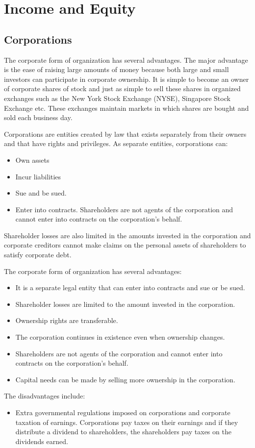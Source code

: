 \documentclass[../main.tex]{subfiles}
\begin{document}
	\section{Income and Equity}
	
	\subsection{Corporations}
	
	The corporate form of organization has several advantages. The major 
	advantage is the ease of raising large amounts of money because both large 
	and small investors can participate in corporate ownership. It is simple to 
	become an owner of corporate shares of stock and just as simple to sell 
	these shares in organized exchanges such as the New York Stock Exchange 
	(NYSE), Singapore Stock Exchange etc. These exchanges maintain markets in 
	which shares are bought and sold each business day. 
	
	Corporations are entities created by law that exists separately from their 
	owners and that have rights and privileges. As separate entities, 
	corporations can:
	\begin{itemize}[noitemsep]
		\item Own assets
		\item Incur liabilities
		\item Sue and be sued.
		\item Enter into contracts. Shareholders are not agents of the 
		corporation and cannot enter into contracts on the corporation's 
		behalf. 
	\end{itemize}
	Shareholder losses are also limited in the amounts invested in the 
	corporation and corporate creditors cannot make claims on the personal 
	assets of shareholders to satisfy corporate debt.
	
	The corporate  form of organization has several advantages:
	\begin{itemize}[noitemsep]
		\item It is a separate legal entity that can enter into contracts and 
		sue or be sued. 
		\item Shareholder losses are limited to the amount invested in the 
		corporation.
		\item Ownership rights are transferable. 
		\item The corporation continues in existence even when ownership 
		changes. 
		\item Shareholders are not agents of the corporation and cannot enter 
		into contracts on the corporation's behalf. 
		\item Capital needs can be made by selling more ownership in the 
		corporation. 
	\end{itemize}
	The disadvantages include:
	\begin{itemize}[noitemsep]
		\item Extra governmental regulations imposed on corporations and 
		corporate taxation of earnings. Corporations pay taxes on their 
		earnings and if they distribute a dividend to shareholders, the 
		shareholders pay taxes on the dividends earned. 
	\end{itemize}
\end{document}
